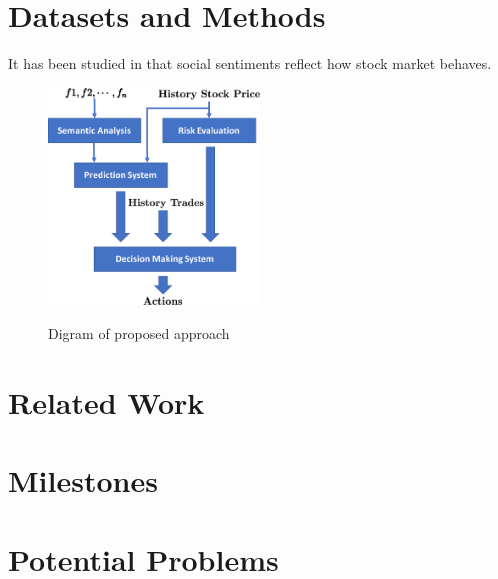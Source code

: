 \documentclass[a4paper, 11pt]{article}
\begin{document}
\begin{spacing}{1}
    \section{Datasets and Methods}
    It has been studied in \cite{social_relation_sentiment_analysis} that social sentiments reflect how stock market behaves. 
    
    \begin{figure}
      \centering
      \includegraphics[width=0.5\textwidth]{diagram}
      \label{diagram_approach}
      \caption{Digram of proposed approach}
    \end{figure}
    
    
    \section{Related Work}
    \cite{cs229_stanford_portfolio}
    
    \section{Milestones}
    
    \section{Potential Problems} 
  
  \end{spacing}  
  
  
\end{document}
